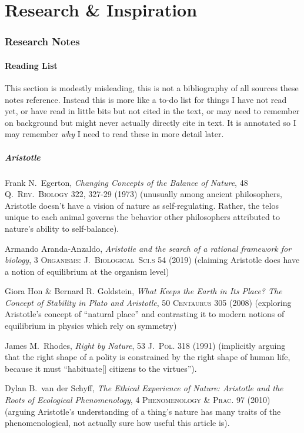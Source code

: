 \documentclass[../FGP.tex]{subfiles}
\begin{document}
\setmarginpargeometry
\part*{Research \& Inspiration}
\section{Research Notes}
\subsection{Reading List}
This section is modestly misleading, this is not a bibliography of all sources these notes reference. Instead this is more like a to-do list for things I have not read yet, or have read in little bits but not cited in the text, or may need to remember on background but might never actually directly cite in text. It is annotated so I may remember \emph{why} I need to read these in more detail later. 
\subsubsection{Aristotle}\label{biblio:aristotle}
\begin{annotated-bibliography}
  \item Frank N.~Egerton, \textit{Changing Concepts of the Balance of Nature}, 48 \textsc{Q.~Rev.~Biology} 322, 327-29 (1973) (unusually among ancient philosophers, Aristotle doesn't have a vision of nature as self-regulating. Rather, the telos unique to each animal governs the behavior other philosophers attributed to nature's ability to self-balance).
  \item Armando Aranda-Anzaldo, \textit{Aristotle and the search of a rational framework for biology}, 3 \textsc{Organisms: J.~Biological~Sci.s} 54 (2019) (claiming Aristotle does have a notion of equilibrium at the organism level) 
  \item Giora Hon \& Bernard R. Goldstein, \textit{What Keeps the Earth in Its Place? The Concept of Stability in Plato and Aristotle}, 50 \textsc{Centaurus} 305 (2008) (exploring Aristotle's concept of ``natural place'' and contrasting it to modern notions of equilibrium in physics which rely on symmetry)
  \item James M.~Rhodes, \textit{Right by Nature}, 53 \textsc{J.~Pol.} 318 (1991) (implicitly arguing that the right shape of a polity is constrained by the right shape of human life, because it must ``habituate[] citizens to the virtues'').
  \item Dylan B.~van der Schyff, \textit{The Ethical Experience of Nature: Aristotle and the Roots of Ecological Phenomenology}, 4 \textsc{Phenomenology \& Prac.} 97 (2010) (arguing Aristotle's understanding of a thing's nature has many traits of the phenomenological, not actually sure how useful this article is).
\end{annotated-bibliography}
\end{document}
